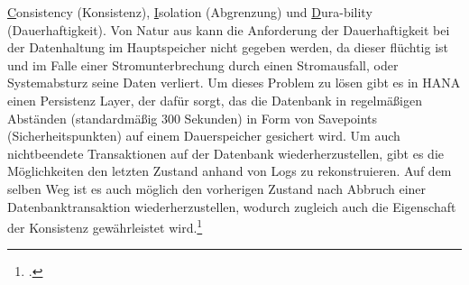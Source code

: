 \underline{C}onsistency (Konsistenz), \underline{I}solation (Abgrenzung) und \underline{D}ura-bility (Dauerhaftigkeit). Von Natur aus kann die Anforderung der Dauerhaftigkeit bei der Datenhaltung im Hauptspeicher nicht gegeben werden, da dieser flüchtig ist und im Falle einer Stromunterbrechung durch einen Stromausfall, oder Systemabsturz seine Daten verliert. Um dieses Problem zu lösen gibt es in HANA einen \glqq{}Persistenz Layer\grqq{}, der dafür sorgt, das die Datenbank in regelmäßigen Abständen (standardmäßig 300 Sekunden) in Form von \glqq{}Savepoints\grqq{} (Sicherheitspunkten) auf einem Dauerspeicher gesichert wird. Um auch nichtbeendete Transaktionen auf der Datenbank wiederherzustellen, gibt es die Möglichkeiten den letzten Zustand anhand von Logs zu rekonstruieren. Auf dem selben Weg ist es auch möglich den vorherigen Zustand nach Abbruch einer Datenbanktransaktion wiederherzustellen, wodurch zugleich auch die Eigenschaft der Konsistenz gewährleistet wird.\footcite[Vgl.][]{rz10-acid}

